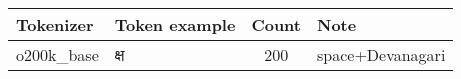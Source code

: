 \documentclass{article}
\newcommand{\devtxt}[1]{#1}
\begin{document}
\begin{table}[t]
\centering
\begin{tabular}{l l c l}
\toprule
Tokenizer & Token example & Count & Note \\
\midrule
o200k_base & \textvisiblespace{}\devtxt{क्ष} & 200 & space+Devanagari \\
\bottomrule
\end{tabular}
\end{table}
\end{document}
